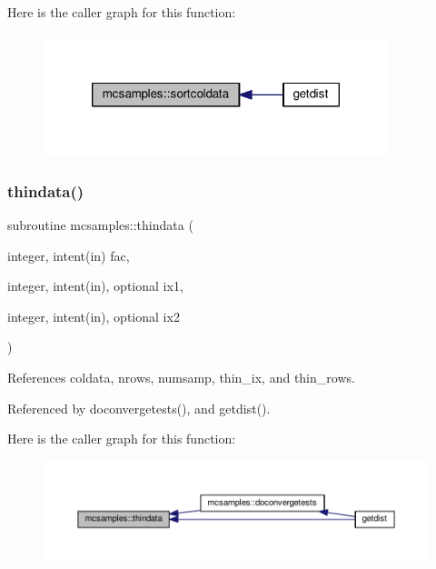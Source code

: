 Here is the caller graph for this function\+:
\nopagebreak
\begin{figure}[H]
\begin{center}
\leavevmode
\includegraphics[width=284pt]{namespacemcsamples_af00e1e65ba0440ba9f05136bb9219f55_icgraph}
\end{center}
\end{figure}
\mbox{\label{namespacemcsamples_ad5ab7ed94d3a34782ce86ebc0d23e148}} 
\subsubsection{\texorpdfstring{thindata()}{thindata()}}
{\footnotesize\ttfamily subroutine mcsamples\+::thindata (\begin{DoxyParamCaption}\item[{integer, intent(in)}]{fac,  }\item[{integer, intent(in), optional}]{ix1,  }\item[{integer, intent(in), optional}]{ix2 }\end{DoxyParamCaption})}



References coldata, nrows, numsamp, thin\+\_\+ix, and thin\+\_\+rows.



Referenced by doconvergetests(), and getdist().

Here is the caller graph for this function\+:
\nopagebreak
\begin{figure}[H]
\begin{center}
\leavevmode
\includegraphics[width=350pt]{namespacemcsamples_ad5ab7ed94d3a34782ce86ebc0d23e148_icgraph}
\end{center}
\end{figure}
\mbox{\label{namespacemcsamples_a0a903a19ac6139be1cc98a32218ec801}} 
